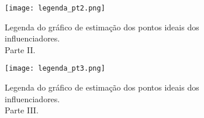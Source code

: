 \documentclass[
	12pt,				%
	openright,			%
	twoside,			%
	a4paper,			%
	english,			%
	brazil				%
	]{abntex2}
\begin{document}
\begin{anexosenv}
 \begin{figure}[!htbp]
    \centering
    \texttt{[image: legenda\_pt2.png]}
    \caption{Legenda do gráfico de estimação dos pontos ideais dos influenciadores.\\ Parte II.}
    \label{leg3}
 \end{figure}

 \begin{figure}[!htbp]
    \centering
    \texttt{[image: legenda\_pt3.png]}
    \caption{Legenda do gráfico de estimação dos pontos ideais dos influenciadores.\\ Parte III.}
    \label{leg3}
 \end{figure}
 




\end{anexosenv}

\printindex
\end{document}
